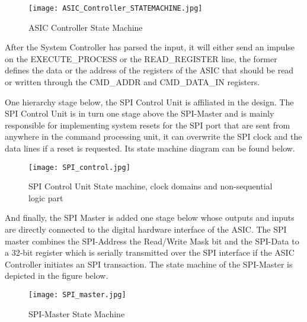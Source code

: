 \begin{figure}[H]
    \centering
    \texttt{[image: ASIC\_Controller\_STATEMACHINE.jpg]}
    \caption[]{ASIC Controller State Machine}
    \label{fig:ASIC_CON_STATE}
\end{figure}

After the System Controller has parsed the input, it will either send an impulse on the EXECUTE\_PROCESS or the READ\_REGISTER line, the former defines the data or the address of the registers of the ASIC that should be read or written through the CMD\_ADDR and CMD\_DATA\_IN registers.

One hierarchy stage below, the SPI Control Unit is affiliated in the design. The SPI Control Unit is in turn one stage above the SPI-Master and is mainly responsible for implementing system resets for the SPI port that are sent from anywhere in the command processing unit, it can overwrite the SPI clock and the data lines if a reset is requested. Its state machine diagram can be found below. 

\begin{figure}[H]
    \centering
    \texttt{[image: SPI\_control.jpg]}
    \caption[]{SPI Control Unit State machine, clock domains and non-sequential logic part}
    \label{fig:ASIC_SPI_STATE}
\end{figure}

And finally, the SPI Master is added one stage below whose outputs and inputs are directly connected to the digital hardware interface of the ASIC. The SPI master combines the SPI-Address the Read/Write Mask bit and the SPI-Data to a 32-bit register which is serially transmitted over the SPI interface if the ASIC Controller initiates an SPI transaction. The state machine of the SPI-Master is depicted in the figure below.

\begin{figure}[H]
    \centering
    \texttt{[image: SPI\_master.jpg]}
    \caption[]{SPI-Master State Machine}
    \label{fig:SPI_master}
\end{figure}




